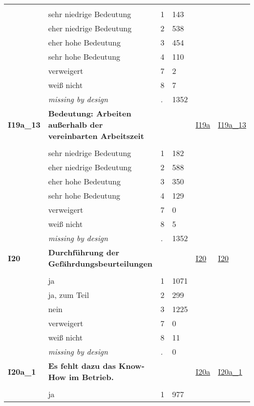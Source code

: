 \begin{longtable}{| L{2.45cm} | L{6cm} | C{1.5cm} | R{1cm} | C{2.25cm} | C{2.25cm} |}
   &  &  &  &  &  \\ 
   & sehr niedrige Bedeutung & 1 & 143 &  &  \\ 
   & eher niedrige Bedeutung & 2 & 538 &  &  \\ 
   & eher hohe Bedeutung & 3 & 454 &  &  \\ 
   & sehr hohe Bedeutung & 4 & 110 &  &  \\ 
   & verweigert & 7 & 2 &  &  \\ 
   & weiß nicht & 8 & 7 &  &  \\ 
   & \textit{missing by design} & \textit{.} & 1352 &  &  \\ 
   \midrule
\textbf{I19a\_13}\label{var:I19a:13} & \textbf{Bedeutung: Arbeiten außerhalb der vereinbarten Arbeitszeit} &  &  & \hyperref[I19a]{I19a} & \hyperref[var:suf:I19a:13]{I19a\_13} \\ 
   &  &  &  &  &  \\ 
   & sehr niedrige Bedeutung & 1 & 182 &  &  \\ 
   & eher niedrige Bedeutung & 2 & 588 &  &  \\ 
   & eher hohe Bedeutung & 3 & 350 &  &  \\ 
   & sehr hohe Bedeutung & 4 & 129 &  &  \\ 
   & verweigert & 7 & 0 &  &  \\ 
   & weiß nicht & 8 & 5 &  &  \\ 
   & \textit{missing by design} & \textit{.} & 1352 &  &  \\ 
   \midrule
\textbf{I20}\label{var:I20} & \textbf{Durchführung der Gefährdungsbeurteilungen} &  &  & \hyperref[I20]{I20} & \hyperref[var:suf:I20]{I20} \\ 
   &  &  &  &  &  \\ 
   & ja & 1 & 1071 &  &  \\ 
   & ja, zum Teil & 2 & 299 &  &  \\ 
   & nein & 3 & 1225 &  &  \\ 
   & verweigert & 7 & 0 &  &  \\ 
   & weiß nicht & 8 & 11 &  &  \\ 
   & \textit{missing by design} & \textit{.} & 0 &  &  \\ 
   \midrule
\textbf{I20a\_1}\label{var:I20a:1} & \textbf{Es fehlt dazu das Know-How im Betrieb.} &  &  & \hyperref[I20a]{I20a} & \hyperref[var:suf:I20a:1]{I20a\_1} \\ 
   &  &  &  &  &  \\ 
   & ja & 1 & 977 &  &  \\ 

\end{longtable}
